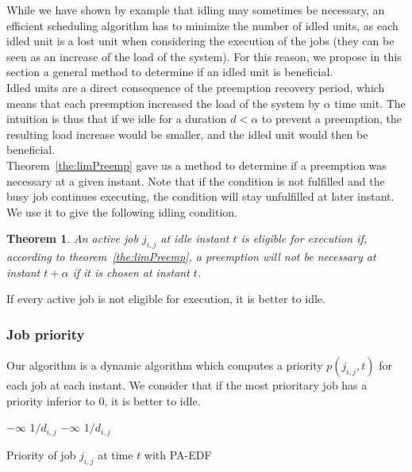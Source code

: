 \documentclass[a4paper,10pt]{article}
\newtheorem{theorem}{Theorem}
\begin{document}
        While we have shown by example that idling may sometimes be necessary, an efficient scheduling algorithm has to minimize the number of idled units, as each idled unit is a lost unit when considering the execution of the jobs (they can be seen as an increase of the load of the system). For this reason, we propose in this section a general method to determine if an idled unit is beneficial.\\

        Idled units are a direct consequence of the preemption recovery period, which means that each preemption increased the load of the system by $\alpha$ time unit. The intuition is thus that if we idle for a duration $d < \alpha$ to prevent a preemption, the resulting load increase would be smaller, and the idled unit would then be beneficial.\\

        Theorem~\ref{the:limPreemp} gave us a method to determine if a preemption was necessary at a given instant. Note that if the condition is not fulfilled and the busy job continues executing, the condition will stay unfulfilled at later instant. We use it to give the following idling condition.

        \begin{theorem}
            An active job $j_{i,j}$ at idle instant $t$ is eligible for execution if, according to theorem~\ref{the:limPreemp}, a preemption will not be necessary at instant $t + \alpha$ if it is chosen at instant $t$.
        \end{theorem}

        If every active job is not eligible for execution, it is better to idle.

    \subsubsection{Job priority}

        Our algorithm is a dynamic algorithm which computes a priority $p(j_{i,j}, t)$ for each job at each instant. We consider that if the most prioritary job has a priority inferior to 0, it is better to idle.

        \begin{algorithm}[H]
            \begin{algorithmic}[1]
                        \RETURN $- \infty$
                    \ELSE
                        \RETURN $1 / d_{i,j}$
                    \ENDIF
                        \RETURN $- \infty$
                    \ELSE
                    \ENDIF
                \ENDIF
                \RETURN $1 / d_{i,j}$
            \end{algorithmic}
                \caption{Priority of job $j_{i,j}$ at time $t$ with PA-EDF}
                \label{alg:prio}
            \end{algorithm}
\end{document}
